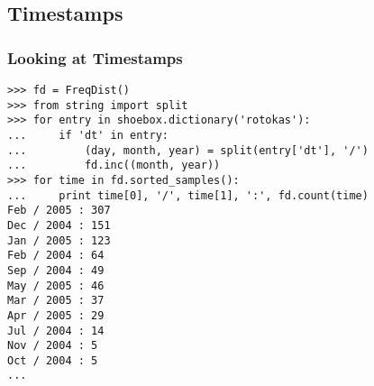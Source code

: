 \documentclass{beamer}             %
\begin{document}
\subsection{Timestamps}

\begin{frame}[fragile]
\frametitle{Looking at Timestamps}

\scriptsize
\begin{verbatim}
>>> fd = FreqDist()
>>> from string import split
>>> for entry in shoebox.dictionary('rotokas'):
...     if 'dt' in entry:
...         (day, month, year) = split(entry['dt'], '/')
...         fd.inc((month, year))
>>> for time in fd.sorted_samples():
...     print time[0], '/', time[1], ':', fd.count(time)
Feb / 2005 : 307
Dec / 2004 : 151
Jan / 2005 : 123
Feb / 2004 : 64
Sep / 2004 : 49
May / 2005 : 46
Mar / 2005 : 37
Apr / 2005 : 29
Jul / 2004 : 14
Nov / 2004 : 5
Oct / 2004 : 5
...
\end{verbatim}
\end{frame}
\end{document}
